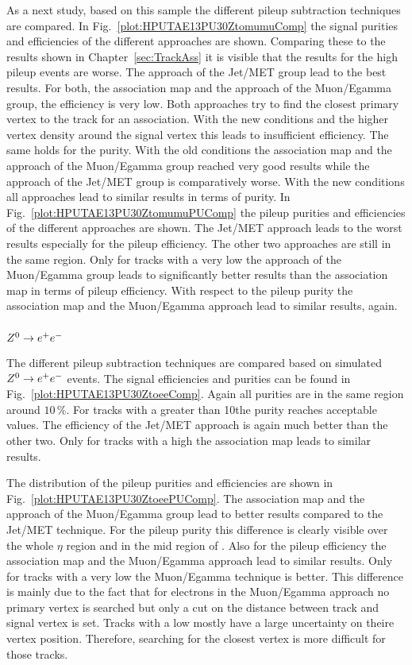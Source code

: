 As a next study, based on this sample the different pileup subtraction techniques are compared. In Fig.~\ref{plot:HPUTAE13PU30ZtomumuComp} the signal purities and efficiencies of the different approaches are shown. Comparing these to the results shown in Chapter~\ref{sec:TrackAss} it is visible that the results for the high pileup events are worse. The approach of the Jet/MET group lead to the best results. For both, the association map and the approach of the Muon/Egamma group, the efficiency is very low. Both approaches try to find the closest primary vertex to the track for an association. With the new conditions and the higher vertex density around the signal vertex this leads to insufficient efficiency. The same holds for the purity. With the old conditions the association map and the approach of the Muon/Egamma group reached very good results while the approach of the Jet/MET group is comparatively worse. With the new conditions all approaches lead to similar results in terms of purity.
In Fig.~\ref{plot:HPUTAE13PU30ZtomumuPUComp} the pileup purities and efficiencies of the different approaches are shown. The Jet/MET approach leads to the worst results especially for the pileup efficiency. The other two approaches are still in the same region. Only for tracks with a very low \pt the approach of the Muon/Egamma group leads to significantly better results than the association map in terms of pileup efficiency. With respect to the pileup purity the association map and the Muon/Egamma approach lead to similar results, again.

\subsubsection{${Z^{0}}\rightarrow e^+e^-$ \label{sec:HPUTAE13PU30Ztoee}}

The different pileup subtraction techniques are compared based on simulated ${Z^{0}}\rightarrow e^+e^-$ events. The signal efficiencies and purities can be found in Fig.~\ref{plot:HPUTAE13PU30ZtoeeComp}. Again all purities are in the same region around $10\,\%$. For tracks with a \pt greater than 10\GeV the purity reaches acceptable values. The efficiency of the Jet/MET approach is again much better than the other two. Only for tracks with a high \pt the association map leads to similar results.

The distribution of the pileup purities and efficiencies are shown in Fig.~\ref{plot:HPUTAE13PU30ZtoeePUComp}. The association map and the approach of the Muon/Egamma group lead to better results compared to the Jet/MET technique. For the pileup purity this difference is clearly visible over the whole $\eta$ region and in the mid region of \pt{}. Also for the pileup efficiency the association map and the Muon/Egamma approach lead to similar results. Only for tracks with a very low \pt the Muon/Egamma technique is better. This difference is mainly due to the fact that for electrons in the Muon/Egamma approach no primary vertex is searched but only a cut on the distance between track and signal vertex is set. Tracks with a low \pt mostly have a large uncertainty on theire vertex position. Therefore, searching for the closest vertex is more difficult for those tracks.

